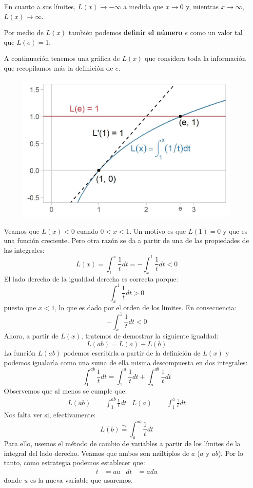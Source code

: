 \documentclass[12pt]{article}
\begin{document}
En cuanto a sus límites, $L(x) \to -\infty$ a medida que $x \to 0$ y, mientras $x \to \infty$, $L(x) \to \infty$.

Por medio de $L(x)$ también podemos \textbf{definir el número} $e$ como un valor tal que $L(e) = 1$.

A continuación tenemos una gráfica de $L(x)$ que considera toda la información que recopilamos más la definición de $e$.

\begin{figure}[hbt!]
\centering
\includegraphics[scale=0.7]{img/log_int_plot.jpg}
\end{figure}

Veamos que $L(x) < 0$ cuando $0 < x < 1$. Un motivo es que $L(1) = 0$ y que es una función creciente. Pero otra razón se da a partir de una de las propiedades de las integrales:
\[
  L(x) = \int_{1}^{x} \frac{1}{t}dt = - \int_{x}^{1} \frac{1}{t}dt < 0
\]
El lado derecho de la igualdad derecha es correcta porque:
\[
  \int_{x}^{1} \frac{1}{t}dt > 0
\]
puesto que $x < 1$, lo que es dado por el orden de los límites. En consecuencia:
\[
  -\int_{x}^{1} \frac{1}{t}dt < 0
\]
Ahora, a partir de $L(x)$, tratemos de demostrar la siguiente igualdad:
\[
  L(ab) = L(a) + L(b)
\]
La función $L(ab)$ podemos escribirla a partir de la definición de $L(x)$ y podemos igualarla como una suma de ella misma descompuesta en dos integrales:
\[
  \int_{1}^{ab} \frac{1}{t}dt = \int_{1}^{a} \frac{1}{t}dt + \int_{a}^{ab} \frac{1}{t}dt
\]
Observemos que al menos se cumple que:
\begin{align*}
  L(ab) &= \int_{1}^{ab} \frac{1}{t}dt & L(a) &= \int_{1}^{a} \frac{1}{t}dt 
\end{align*}
Nos falta ver si, efectivamente:
\[
  L(b) \overset{\text{??}}{=} \int_{a}^{ab} \frac{1}{t}dt
\]
Para ello, usemos el método de cambio de variables a partir de los límites de la integral del lado derecho. Veamos que ambos son múltiplos de $a$ ($a$ y $ab$). Por lo tanto, como estrategia podemos establecer que:
\begin{align*}
  t &= au & dt &= adu
\end{align*}
donde $u$ es la nueva variable que usaremos.
\end{document}
